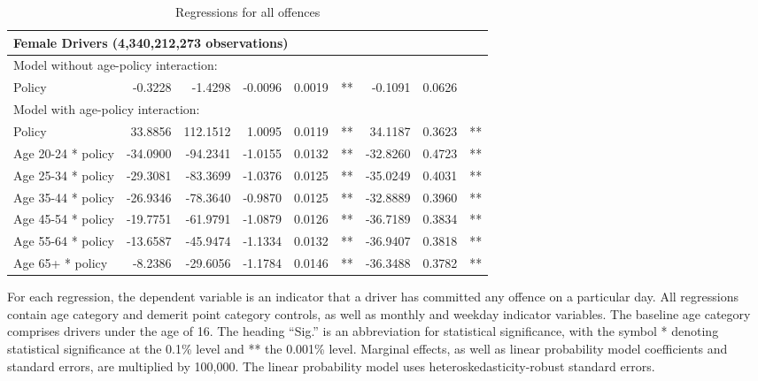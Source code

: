 \begin{table}
\begin{tabular}{l r r r r l r r l}
\hline 

\multicolumn{8}{l}{\textbf{Female Drivers} (4,340,212,273 observations)} \\ 

\hline
\multicolumn{8}{l}{Model without age-policy interaction: } \\ 
Policy                   &  -0.3228        &  -1.4298       &  -0.0096        &  0.0019       &   **       &  -0.1091        &  0.0626       &            \\ 
\hline
\multicolumn{8}{l}{Model with age-policy interaction: } \\ 
Policy                   &  33.8856        &  112.1512       &  1.0095        &  0.0119       &   **       &  34.1187        &  0.3623       &   **       \\ 
Age 20-24 * policy   &  -34.0900        &  -94.2341       &  -1.0155        &  0.0132       &   **       &  -32.8260        &  0.4723       &   **       \\ 
Age 25-34 * policy   &  -29.3081        &  -83.3699       &  -1.0376        &  0.0125       &   **       &  -35.0249        &  0.4031       &   **       \\ 
Age 35-44 * policy   &  -26.9346        &  -78.3640       &  -0.9870        &  0.0125       &   **       &  -32.8889        &  0.3960       &   **       \\ 
Age 45-54 * policy   &  -19.7751        &  -61.9791       &  -1.0879        &  0.0126       &   **       &  -36.7189        &  0.3834       &   **       \\ 
Age 55-64 * policy   &  -13.6587        &  -45.9474       &  -1.1334        &  0.0132       &   **       &  -36.9407        &  0.3818       &   **       \\ 
Age 65+ * policy   &  -8.2386        &  -29.6056       &  -1.1784        &  0.0146       &   **       &  -36.3488        &  0.3782       &   **       \\ 

\hline 

\end{tabular} 
\caption{Regressions for all offences} 
For each regression, the dependent variable is an indicator that a driver has committed  
any offence on a particular day.  
All regressions contain age category and demerit point category controls, 
as well as monthly and weekday indicator variables. 
The baseline age category comprises drivers under the age of 16. 
The heading ``Sig.'' is an abbreviation for statistical significance, with 
the symbol * denoting statistical significance at the 0.1\% level 
and ** the 0.001\% level. 
Marginal effects, as well as linear probability model coefficients and standard errors, are  
multiplied by 100,000.  
The linear probability model uses heteroskedasticity-robust standard errors. 
\label{tab:seas_Logit_vs_LPMx100K_regs} 
\end{table} 
 
